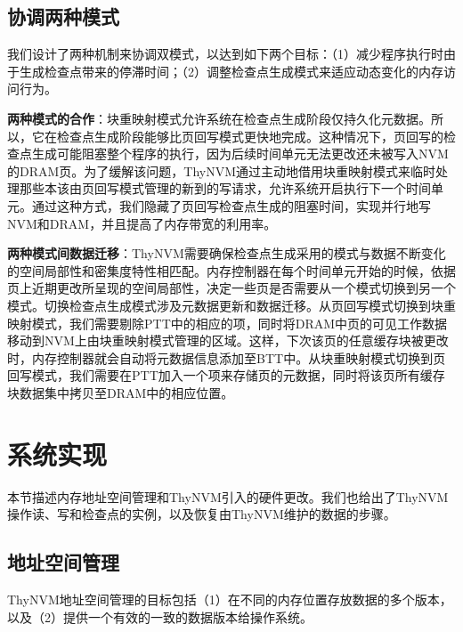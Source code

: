 \subsection{协调两种模式}
\label{subsec:coordination}

我们设计了两种机制来协调双模式，以达到如下两个目标：（1）减少程序执行时由于生成检查点带来的停滞时间；（2）调整检查点生成模式来适应动态变化的内存访问行为。

\textbf{两种模式的合作}：块重映射模式允许系统在检查点生成阶段仅持久化元数据。所以，它在检查点生成阶段能够比页回写模式更快地完成。这种情况下，页回写的检查点生成可能阻塞整个程序的执行，因为后续时间单元无法更改还未被写入NVM的DRAM页。为了缓解该问题，ThyNVM通过主动地借用块重映射模式来临时处理那些本该由页回写模式管理的新到的写请求，允许系统开启执行下一个时间单元。通过这种方式，我们隐藏了页回写检查点生成的阻塞时间，实现并行地写NVM和DRAM，并且提高了内存带宽的利用率。

\textbf{两种模式间数据迁移}：ThyNVM需要确保检查点生成采用的模式与数据不断变化的空间局部性和密集度特性相匹配。内存控制器在每个时间单元开始的时候，依据页上近期更改所呈现的空间局部性，决定一些页是否需要从一个模式切换到另一个模式。切换检查点生成模式涉及元数据更新和数据迁移。从页回写模式切换到块重映射模式，我们需要剔除PTT中的相应的项，同时将DRAM中页的可见工作数据移动到NVM上由块重映射模式管理的区域。这样，下次该页的任意缓存块被更改时，内存控制器就会自动将元数据信息添加至BTT中。从块重映射模式切换到页回写模式，我们需要在PTT加入一个项来存储页的元数据，同时将该页所有缓存块数据集中拷贝至DRAM中的相应位置。

\section{系统实现}
\label{sec:implementation}

本节描述内存地址空间管理和ThyNVM引入的硬件更改。我们也给出了ThyNVM操作读、写和检查点的实例，以及恢复由ThyNVM维护的数据的步骤。

\subsection{地址空间管理}
\label{subsec:thnvm-space}

ThyNVM地址空间管理的目标包括（1）在不同的内存位置存放数据的多个版本，以及（2）提供一个有效的一致的数据版本给操作系统。

